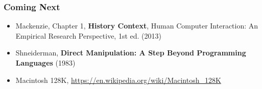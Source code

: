 \documentclass{beamer}
\begin{document}
\begin{frame}
	\frametitle{Coming Next}
	\begin{itemize}
		\item Mackenzie, Chapter 1, \textbf{History Context}, Human Computer Interaction: An Empirical Research Perspective, 1st ed. (2013) 
		\item Shneiderman, \textbf{Direct Manipulation: A Step Beyond Programming Languages} (1983)
		\item Macintosh 128K, \url{https://en.wikipedia.org/wiki/Macintosh_128K}
	\end{itemize}
\end{frame}

%
%


%
%
%
\end{document}
